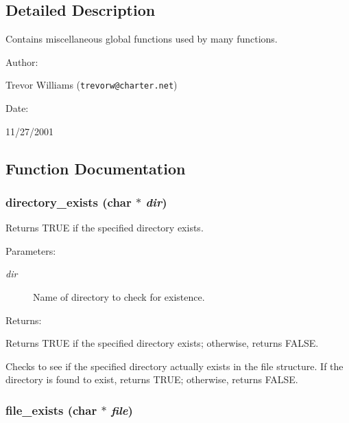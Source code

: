 \subsection{Detailed Description}
Contains miscellaneous global functions used by many functions.



\begin{Desc}
\item[Author: ]\par
Trevor Williams ({\tt trevorw@charter.net}) \end{Desc}
\begin{Desc}
\item[Date: ]\par
11/27/2001\end{Desc}


\subsection{Function Documentation}
\subsubsection{ directory\_\-exists (char $\ast$ {\em dir})}\label{util_8h_a4}


Returns TRUE if the specified directory exists.

\begin{Desc}
\item[Parameters: ]\par
\begin{description}
\item[{\em 
dir}]Name of directory to check for existence. \end{description}
\end{Desc}
\begin{Desc}
\item[Returns: ]\par
Returns TRUE if the specified directory exists; otherwise, returns FALSE.\end{Desc}
Checks to see if the specified directory actually exists in the file structure. If the directory is found to exist, returns TRUE; otherwise, returns FALSE. 
\subsubsection{ file\_\-exists (char $\ast$ {\em file})}\label{util_8h_a5}


